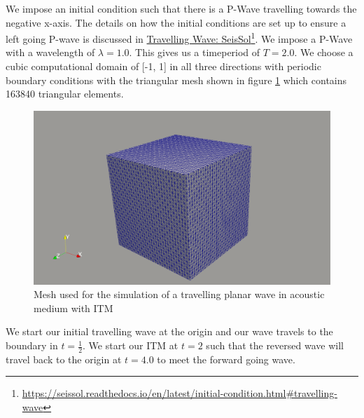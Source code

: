We impose an initial condition such that there is a P-Wave travelling towards the negative x-axis. The details on how the initial conditions are set up to ensure a left going P-wave is discussed in
\href{https://seissol.readthedocs.io/en/latest/initial-condition.html#travelling-wave}{Travelling Wave: SeisSol}\footnote{\href{https://seissol.readthedocs.io/en/latest/initial-condition.html\#travelling-wave}{https://seissol.readthedocs.io/en/latest/initial-condition.html\#travelling-wave}}. We impose a P-Wave with a wavelength of 
$\lambda = 1.0$. This gives us a timeperiod of $T=2.0$. We choose a cubic computational domain of [-1, 1] in all three directions with periodic boundary conditions with the triangular mesh shown in figure \ref{fig:acoustic_mesh} which contains
163840 triangular elements. 

\begin{figure}[!htpb]
    \centering
    \includegraphics[width=0.85\linewidth]{figures/mesh_cube.png}
    \caption{Mesh used for the simulation of a travelling planar wave in acoustic medium with \ac{ITM}}
    \label{fig:acoustic_mesh}
\end{figure}
\par We start our initial travelling wave at the origin and our wave travels to the boundary in $t = \frac{1}{2}$. We start our \ac{ITM} at $t=2$ such that the reversed wave will travel back to the origin at $t=4.0$ to meet the
forward going wave. 

